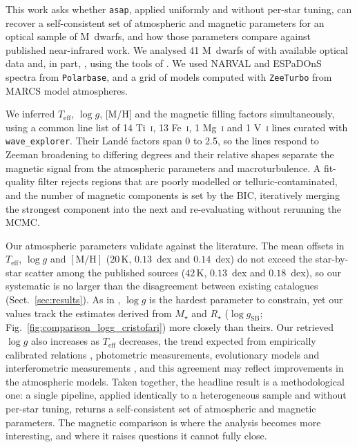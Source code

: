This work asks whether \texttt{asap}, applied uniformly and without
per-star tuning, can recover a self-consistent set of atmospheric and
magnetic parameters for an optical sample of M~dwarfs, and how those
parameters compare against published near-infrared work. We analysed
41 M~dwarfs of \citet{cristofari_2023b} with available optical data and, in part, \citet{reiners+2022},
using the tools of \citet{cristofari_2023a}. We used NARVAL and ESPaDOnS spectra
from \texttt{Polarbase}, and a grid of models computed with \texttt{ZeeTurbo}
from MARCS model atmospheres.

We inferred $T_\mathrm{eff}$, $\log g$, [M/H] and the magnetic filling factors
simultaneously, using a common line list of 14 Ti~\textsc{i}, 13 Fe~\textsc{i},
1 Mg~\textsc{i} and 1 V~\textsc{i} lines curated with \texttt{wave\_explorer}.
Their Landé factors span 0 to 2.5, so the lines respond to Zeeman broadening
to differing degrees and their relative shapes separate the magnetic signal
from the atmospheric parameters and macroturbulence. A fit-quality filter
rejects regions that are poorly modelled or telluric-contaminated, and the
number of magnetic components is set by the BIC, iteratively merging the
strongest component into the next and re-evaluating without rerunning the MCMC.

Our atmospheric parameters validate against the literature. The mean offsets in $T_\mathrm{eff}$, $\log g$ and $[\mathrm{M/H}]$ ($20\,\mathrm{K}$, $0.13$~dex and $0.14$~dex) do not exceed the star-by-star scatter among the published sources ($42\,\mathrm{K}$, $0.13$~dex and $0.18$~dex), so our systematic is no larger than the disagreement between existing catalogues (Sect.~\ref{sec:results}). As in \citet{cristofari_2023b}, $\log g$ is the hardest parameter to constrain, yet our values track the estimates derived from $M_\star$ and $R_\star$ ($\log g_\mathrm{SB}$; Fig.~\ref{fig:comparison_logg_cristofari}) more closely than theirs. Our retrieved $\log g$ also increases as $T_\mathrm{eff}$ decreases, the trend expected from empirically calibrated relations \citep{Mann_2015}, photometric measurements, evolutionary models \citep{Feiden_2012, Baraffe_2015} and interferometric measurements \citep{Boyajian_2012}, and this agreement may reflect improvements in the atmospheric models. Taken together, the headline result is a methodological one: a single pipeline, applied identically to a heterogeneous sample and without per-star tuning, returns a self-consistent set of atmospheric and magnetic parameters. The magnetic comparison is where the analysis becomes more interesting, and where it raises questions it cannot fully close.

